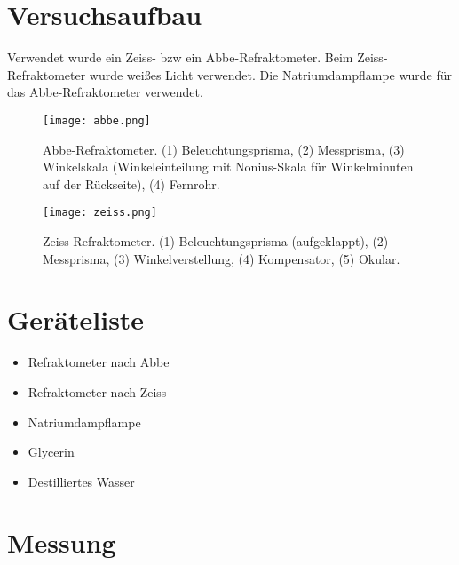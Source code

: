 \documentclass[a4paper]{article}
\begin{document}
\section{Versuchsaufbau}
Verwendet wurde ein Zeiss- bzw ein Abbe-Refraktometer.
Beim Zeiss-Refraktometer wurde weißes Licht verwendet.
Die Natriumdampflampe wurde für das Abbe-Refraktometer verwendet.

\begin{figure}[ht]
  \begin{center}
    \texttt{[image: abbe.png]}
  \end{center}
  \caption{Abbe-Refraktometer. (1) Beleuchtungsprisma, (2) Messprisma, (3) Winkelskala
(Winkeleinteilung mit Nonius-Skala für Winkelminuten auf der Rückseite), (4) Fernrohr.}
  \label{fig:abbe}
\end{figure}

\begin{figure}[ht]
  \begin{center}
    \texttt{[image: zeiss.png]}
  \end{center}
  \caption{Zeiss-Refraktometer. (1) Beleuchtungsprisma (aufgeklappt), (2) Messprisma, (3)
Winkelverstellung, (4) Kompensator, (5) Okular.}
  \label{fig:zeiss}
\end{figure}

\section{Geräteliste}
\begin{itemize}
  \item Refraktometer nach Abbe 
  \item Refraktometer nach Zeiss
  \item Natriumdampflampe
  \item Glycerin
  \item Destilliertes Wasser
\end{itemize}
\newpage
\section{Messung}
\end{document}
